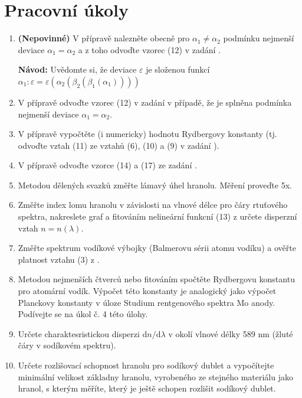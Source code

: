 \documentclass[english]{article}
\begin{document}


\setlength{\parindent}{0.5cm}
\section{Pracovní úkoly}
\begin{enumerate}
\item \textbf{(Nepovinné)} V přípravě nalezněte obecně pro $\alpha_1 \neq \alpha_2$ podmínku nejmenší deviace $\alpha_1=\alpha_2$ a z toho odvoďte vzorec (12) v zadání \cite{bib:zadani}.

\textbf{Návod:} Uvědomte si, že deviace $\varepsilon$ je složenou funkcí $\alpha_1:\varepsilon=\varepsilon(\alpha_2(\beta_2(\beta_1(\alpha_1))))$

\item V přípravě odvoďte vzorec (12) v zadání \cite{bib:zadani} v případě, že je splněna podmínka nejmenší deviace $\alpha_1=\alpha_2$.

\item V přípravě vypočtěte (i numericky) hodnotu Rydbergovy konstanty (tj. odvoďte vztah (11) ze vztahů (6), (10) a (9) v zadání \cite{bib:zadani}).

\item V přípravě odvoďte vzorce (14) a (17) ze zadání \cite{bib:zadani}.

\item Metodou dělených svazků změřte lámavý úhel hranolu. Měření proveďte 5x.

\item Změřte index lomu hranolu v závislosti na vlnové délce pro čáry rtuťového spektra, nakreslete graf a fitováním nelineární funkcní (13) z \cite{bib:zadani} určete disperzní vztah $n=n(\lambda)$.

\item Změřte spektrum vodíkové výbojky (Balmerovu sérii atomu vodíku) a ověřte platnost vztahu (3) z \cite{bib:zadani}.

\item Metodou nejmenších čtverců nebo fitováním spočtěte Rydbergovu konstantu pro atomární vodík. Výpočet této konstanty je analogický jako výpočet Planckovy konstanty v úloze Studium rentgenového spektra Mo anody. Podívejte se na úkol č. 4 této úlohy.

\item Určete charaktesristickou disperzi $\mathrm{d}n/\mathrm{d}\lambda$ v okolí vlnové délky 589 nm (žluté čáry v sodíkovém spektru).

\item Určete rozlišovací schopnost hranolu pro sodíkový dublet a vypočítejte minimální velikost základny hranolu, vyrobeného ze stejného materiálu jako hranol, s kterým měříte, který je ještě schopen rozlišit sodíkový dublet.

\end{enumerate}
\end{document}
